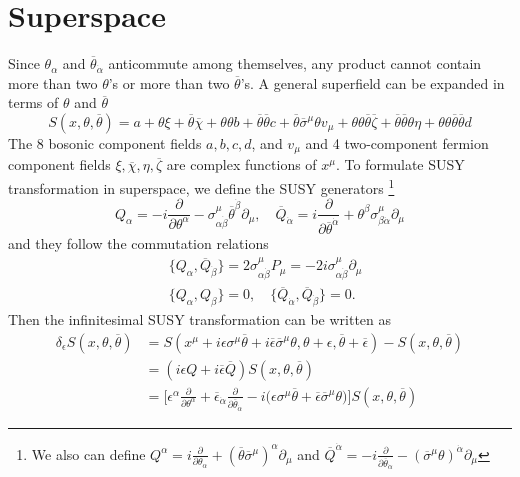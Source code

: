 \documentclass[12pt]{report}
\begin{document}
\section{Superspace}
Since $\theta_{\alpha}$ and $\overline{\theta}_{\dot{\alpha}}$ anticommute among themselves, any product cannot contain more than two $\theta$'s or more than two $\overline{\theta}$'s.
A general superfield can be expanded in terms of $\theta$ and $\overline{\theta}$
\begin{equation}
S(x, \theta, \overline{\theta}) = a + \theta \xi + \overline{\theta} \overline{\chi} + \theta \theta b + \overline{\theta} \overline{\theta} c + \overline{\theta} \overline{\sigma}^{\mu} \theta v_{\mu} + \theta \theta \overline{\theta} \overline{\zeta} + \overline{\theta} \overline{\theta} \theta \eta + \theta \theta \overline{\theta} \overline{\theta} d
\end{equation}
The 8 bosonic component fields $a, b, c, d$, and $v_{\mu}$ and 4 two-component fermion component fields $\xi, \overline{\chi}, \eta, \overline{\zeta}$ are complex functions of $x^{\mu}$.
To formulate SUSY transformation in superspace, we define the SUSY generators 
\footnote{We also can define 
$Q^{\alpha} = i \frac{\partial}{\partial \theta_{\alpha}} + (\overline{\theta} \overline{\sigma}^{\mu})^{\alpha} \partial_{\mu}$ and 
$\overline{Q}^{\dot{\alpha}} = -i \frac{\partial}{\partial \overline{\theta}_{\dot{\alpha}}} - (\overline{\sigma}^{\mu} \theta)^{\dot{\alpha}} \partial_{\mu}$}
\begin{equation}
Q_{\alpha} = -i \frac{\partial}{\partial \theta^{\alpha}} - \sigma^{\mu}_{\alpha \dot{\beta}} \overline{\theta}^{\dot{\beta}} \partial_{\mu}, \quad 
\overline{Q}_{\dot{\alpha}} = i \frac{\partial}{\partial \overline{\theta}^{\dot{\alpha}}} + \theta^{\beta} \sigma^{\mu}_{\beta \dot{\alpha}} \partial_{\mu}
\end{equation}
and they follow the commutation relations
\begin{align}
& \{Q_{\alpha}, \overline{Q}_{\dot{\beta}}\} = 2 \sigma^{\mu}_{\alpha \dot{\beta}} P_{\mu} = -2i \sigma^{\mu}_{\alpha \dot{\beta}} \partial_{\mu} \\
& \{Q_{\alpha}, Q_{\beta}\} = 0, \quad 
\{\overline{Q}_{\dot{\alpha}}, \overline{Q}_{\dot{\beta}}\} = 0 .
\end{align}
Then the infinitesimal SUSY transformation can be written as
\begin{align}
\delta_{\epsilon} S(x, \theta, \overline{\theta}) &= S(x^{\mu} + i \epsilon \sigma^{\mu}\overline{\theta} + i \overline{\epsilon} \overline{\sigma}^{\mu} \theta, \theta + \epsilon, \overline{\theta} + \overline{\epsilon}) - S(x, \theta, \overline{\theta})\\
&= (i \epsilon Q + i \overline{\epsilon} \overline{Q}) S(x, \theta, \overline{\theta})\\
&= \Big[ \epsilon^{\alpha} \frac{\partial}{\partial \theta^{\alpha}} + \overline{\epsilon}_{\dot{\alpha}} \frac{\partial}{\partial \overline{\theta}_{\dot{\alpha}}} - i \big( \epsilon \sigma^{\mu} \overline{\theta} + \overline{\epsilon} \overline{\sigma}^{\mu} \theta \big)  \Big] S(x, \theta, \overline{\theta})
\end{align}
\end{document}
